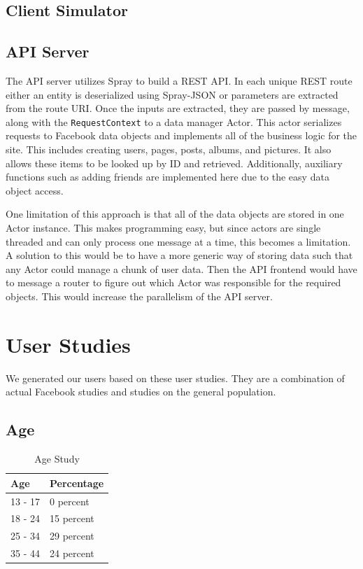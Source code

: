 \documentclass{article}
\begin{document}
\subsection*{Client Simulator}

\subsection*{API Server}
The API server utilizes Spray to build a REST API. In each unique REST route either an entity is deserialized using Spray-JSON or parameters are extracted from the route URI. Once the inputs are extracted, they are passed by message, along with the \texttt{RequestContext} to a data manager Actor. This actor serializes requests to Facebook data objects and implements all of the business logic for the site. This includes creating users, pages, posts, albums, and pictures. It also allows these items to be looked up by ID and retrieved. Additionally, auxiliary functions such as adding friends are implemented here due to the easy data object access.

One limitation of this approach is that all of the data objects are stored in one Actor instance. This makes programming easy, but since actors are single threaded and can only process one message at a time, this becomes a limitation. A solution to this would be to have a more generic way of storing data such that any Actor could manage a chunk of user data. Then the API frontend would have to message a router to figure out which Actor was responsible for the required objects. This would increase the parallelism of the API server.

\section*{User Studies}
We generated our users based on these user studies. They are a combination of actual Facebook studies and studies on the general population.
\subsection*{Age}
\begin{table}[H]
\centering
\begin{tabular}{|p{2cm}||p{2cm}|} 
 \hline
 Age & Percentage \\ [0.5ex] 
 \hline\hline
 13 - 17 & 0 percent \\
 \hline
 18 - 24 & 15 percent \\
 \hline
 25 - 34 & 29 percent \\
 \hline
 35 - 44 & 24 percent \\ [1ex] 
 \hline
\end{tabular}
\caption{Age Study \cite{sproutsocialwebsite}}
\label{table:1}
\end{table}
\end{document}
